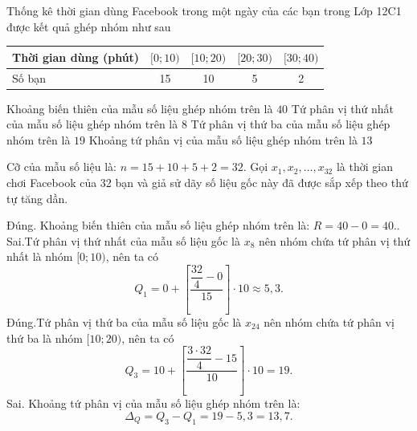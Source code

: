 \begin{ex}%
Thống kê thời gian dùng Facebook trong một ngày của các bạn trong Lớp 12C1 được kết quả ghép nhóm như sau
\begin{center}
\begin{tabular}{|l|c|c|c|c|}
\hline Thời gian dùng (phút) & {$[0 ; 10)$} & {$[10 ; 20)$} & {$[20 ; 30)$} & {$[30 ; 40)$} \\
\hline Số bạn & 15 & 10 & 5 & 2 \\
\hline
\end{tabular}
\end{center}
\choiceTF
{\True Khoảng biến thiên của mẫu số liệu ghép nhóm trên là $40$}
{Tứ phân vị thứ nhất của mẫu số liệu ghép nhóm trên là $8$}
{\True Tứ phân vị thứ ba của mẫu số liệu ghép nhóm trên là $19$}
{Khoảng tứ phân vị của mẫu số liệu ghép nhóm trên là $13$}
\loigiai
{
Cỡ của mẫu số liệu là: $n=15+10+5+2=32$. Gọi $x_1{,} x_2{,} \ldots{,} x_{32}$ là thời gian chơi Facebook của 32 bạn và giả sử dãy số liệu gốc này đã được sắp xếp theo thứ tự tăng dần.
\begin{itemchoice}
\itemch Đúng. Khoảng biến thiên của mẫu số liệu ghép nhóm trên là: $R=40-0=40.$.
\itemch Sai.Tứ phân vị thứ nhất của mẫu số liệu gốc là $x_8$ nên nhóm chứa tứ phân vị thứ nhất là nhóm $[0 ; 10)${,} nên ta có
$$Q_1=0+\left[\dfrac{\dfrac{32}{4}-0}{15}\right] \cdot 10 \approx 5{,}3.$$
\itemch  Đúng.Tứ phân vị thứ ba của mẫu số liệu gốc là $x_{24}$ nên nhóm chứa tứ phân vị thứ ba là nhóm $[10 ; 20)${,} nên ta có
$$Q_3=10+\left[\dfrac{\dfrac{3\cdot 32}{4}-15}{10}\right]\cdot 10=19.$$
\itemch  Sai. Khoảng tứ phân vị của mẫu số liệu ghép nhóm trên là:
$$
\Delta_Q=Q_3-Q_1=19-5{,}3=13{,}7.
$$
\end{itemchoice}
}
\end{ex}

